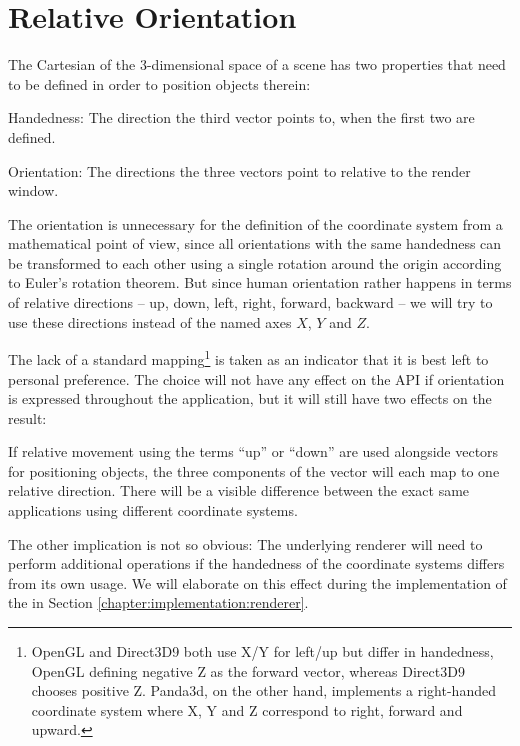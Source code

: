 \section{Relative Orientation}
\label{chapter:design:coordinatesystem}

	The Cartesian  of the 3-dimensional space of a scene has two properties that need to be defined in order to position objects therein:

	\begin{smalllist}
		\item Handedness: The direction the third vector points to, when the first two are defined.
		\item Orientation: The directions the three vectors point to relative to the render window.
	\end{smalllist}

	The orientation is unnecessary for the definition of the coordinate system from a mathematical point of view, since all orientations with the same handedness can be transformed to each other using a single rotation around the origin according to Euler's rotation theorem\cite{PP07}. But since human orientation rather happens in terms of relative directions -- up, down, left, right, forward, backward -- we will try to use these directions instead of the named axes $X$, $Y$ and $Z$.

	The lack of a standard mapping\footnote{OpenGL and Direct3D9 both use X/Y for left/up but differ in handedness, OpenGL defining negative Z as the forward vector\cite{Buss:2003:CGM:861813}, whereas Direct3D9 chooses positive Z\cite{jones2004beginning}. Panda3d, on the other hand, implements a right-handed coordinate system where X, Y and Z correspond to right, forward and upward\cite{Goslin:2004:PGE:1032275.1032359}.} is taken as an indicator that it is best left to personal preference. The choice will not have any effect on the API if orientation is expressed throughout the application, but it will still have two effects on the result:

	\begin{smalllist}
		\item If relative movement using the terms ``up'' or ``down'' are used alongside vectors for positioning objects, the three components of the vector will each map to one relative direction. There will be a visible difference between the exact same applications using different coordinate systems.
		\item The other implication is not so obvious: The underlying renderer will need to perform additional operations if the handedness of the coordinate systems differs from its own usage. We will elaborate on this effect during the implementation of the  in Section \ref{chapter:implementation:renderer}.
	\end{smalllist}

